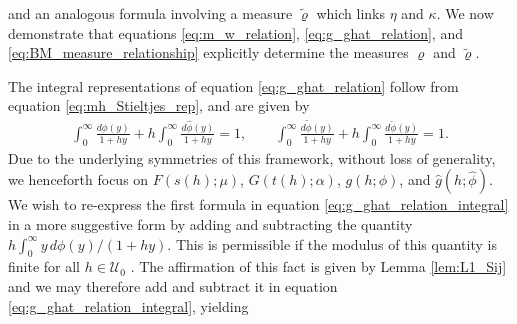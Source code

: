 \documentclass[english,12pt,jmp,graphicx]{revtex4-1}
\newcommand{\ph}{\hat{\phi}}
\newcommand{\pt}{\tilde{\phi}}
\newcommand{\pc}{\check{\phi}}
\begin{document}
%
and an analogous formula involving a measure $\tilde{\varrho}$ which links
$\eta$ and $\kappa$. We now demonstrate that equations \eqref{eq:m_w_relation},
\eqref{eq:g_ghat_relation}, and \eqref{eq:BM_measure_relationship}
explicitly determine the measures $\varrho$ and $\tilde{\varrho}$.

The integral representations of equation \eqref{eq:g_ghat_relation}
follow from equation \eqref{eq:mh_Stieltjes_rep}, and are given by  
%
\begin{align}\label{eq:g_ghat_relation_integral}
  \int_0^\infty\frac{d\phi(y)}{1+hy}+h\int_0^\infty\frac{d\ph(y)}{1+hy}=1,\qquad
  \int_0^\infty\frac{d\pt(y)}{1+hy}+h\int_0^\infty\frac{d\pc(y)}{1+hy}=1.
\end{align}
%
Due to the underlying symmetries of this framework, without loss of
generality, we henceforth focus on $F(s(h);\mu)$, $G(t(h);\alpha)$, $g(h;\phi)$,
and $\hat{g}(h;\ph)$. We wish to re-express the first formula in
equation \eqref{eq:g_ghat_relation_integral} in a more suggestive form
by adding and subtracting the quantity $h\int_0^\infty y\,d\phi(y)/(1+hy)$. This
is permissible if the modulus of this quantity is finite for all
$h\in\mathcal{U}_0$ \cite{Rudin:87,Folland:99}. The affirmation of this
fact is given by Lemma \ref{lem:L1_Sij} and we may therefore add and
subtract it in equation \eqref{eq:g_ghat_relation_integral}, yielding    
%
\end{document}
